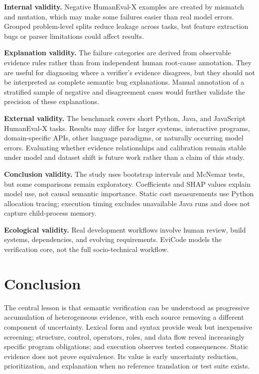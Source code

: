 ﻿\documentclass[conference]{IEEEtran}
\begin{document}
\textbf{Internal validity.} Negative HumanEval-X examples are created by mismatch and mutation, which may make some failures easier than real model errors. Grouped problem-level splits reduce leakage across tasks, but feature extraction bugs or parser limitations could affect results.

\textbf{Explanation validity.} The failure categories are derived from observable evidence rules rather than from independent human root-cause annotation. They are useful for diagnosing where a verifier's evidence disagrees, but they should not be interpreted as complete semantic bug explanations. Manual annotation of a stratified sample of negative and disagreement cases would further validate the precision of these explanations.

\textbf{External validity.} The benchmark covers short Python, Java, and JavaScript HumanEval-X tasks. Results may differ for larger systems, interactive programs, domain-specific APIs, other language paradigms, or naturally occurring model errors. Evaluating whether evidence relationships and calibration remain stable under model and dataset shift is future work rather than a claim of this study.

\textbf{Conclusion validity.} The study uses bootstrap intervals and McNemar tests, but some comparisons remain exploratory. Coefficients and SHAP values explain model use, not causal semantic importance. Static cost measurements use Python allocation tracing; execution timing excludes unavailable Java runs and does not capture child-process memory.

\textbf{Ecological validity.} Real development workflows involve human review, build systems, dependencies, and evolving requirements. EviCode models the verification core, not the full socio-technical workflow.

\section{Conclusion}
The central lesson is that semantic verification can be understood as progressive accumulation of heterogeneous evidence, with each source removing a different component of uncertainty. Lexical form and syntax provide weak but inexpensive screening; structure, control, operators, roles, and data flow reveal increasingly specific program obligations; and execution observes tested consequences. Static evidence does not prove equivalence. Its value is early uncertainty reduction, prioritization, and explanation when no reference translation or test suite exists.
\end{document}
